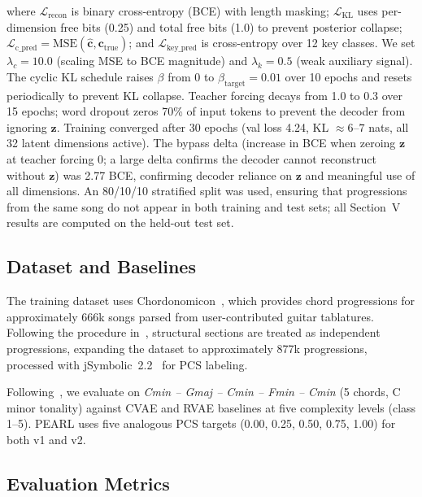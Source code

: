 \documentclass[conference]{IEEEtran}
\begin{document}
where $\mathcal{L}_{\text{recon}}$ is binary cross-entropy (BCE) with length masking; $\mathcal{L}_{\text{KL}}$ uses per-dimension free bits (0.25) and total free bits (1.0) to prevent posterior collapse; $\mathcal{L}_{\text{c\_pred}} = \text{MSE}(\hat{\mathbf{c}}, \mathbf{c}_{\text{true}})$; and $\mathcal{L}_{\text{key\_pred}}$ is cross-entropy over 12 key classes. We set $\lambda_c = 10.0$ (scaling MSE to BCE magnitude) and $\lambda_k = 0.5$ (weak auxiliary signal). The cyclic KL schedule raises $\beta$ from 0 to $\beta_{\text{target}} = 0.01$ over 10 epochs and resets periodically to prevent KL collapse. Teacher forcing decays from 1.0 to 0.3 over 15 epochs; word dropout zeros 70\% of input tokens to prevent the decoder from ignoring $\mathbf{z}$. Training converged after 30 epochs (val loss 4.24, KL $\approx 6$--$7$ nats, all 32 latent dimensions active). The bypass delta (increase in BCE when zeroing $\mathbf{z}$ at teacher forcing 0; a large delta confirms the decoder cannot reconstruct without $\mathbf{z}$) was 2.77 BCE, confirming decoder reliance on $\mathbf{z}$ and meaningful use of all dimensions. An 80/10/10 stratified split was used, ensuring that progressions from the same song do not appear in both training and test sets; all Section~V results are computed on the held-out test set.

\subsection{Dataset and Baselines}

The training dataset uses Chordonomicon~\cite{kantarelis2024chordonomicon}, which provides chord progressions for approximately 666k songs parsed from user-contributed guitar tablatures. Following the procedure in~\cite{kantarelis2024chordonomicon}, structural sections are treated as independent progressions, expanding the dataset to approximately 877k progressions, processed with jSymbolic~2.2~\cite{mckay2018jsymbolic} for PCS labeling.

Following~\cite{comanducci2023vae}, we evaluate on \textit{Cmin -- Gmaj -- Cmin -- Fmin -- Cmin} (5 chords, C minor tonality) against CVAE and RVAE baselines at five complexity levels (class 1--5). PEARL uses five analogous PCS targets (0.00, 0.25, 0.50, 0.75, 1.00) for both v1 and v2.

\subsection{Evaluation Metrics}
\end{document}

